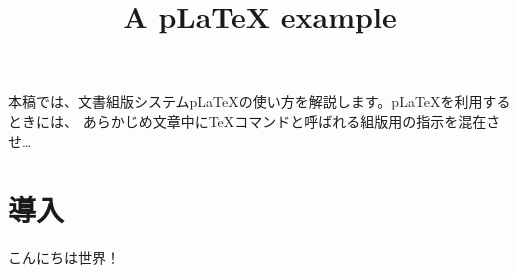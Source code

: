 \documentclass{jsarticle}
\title{A pLaTeX example}
\begin{document}
本稿では、文書組版システムp\LaTeX{}の使い方を解説します。p\LaTeX{}を利用するときには、
あらかじめ文章中に\TeX{}コマンドと呼ばれる組版用の指示を混在させ\ldots

\section{導入}
こんにちは世界！
\end{document}
